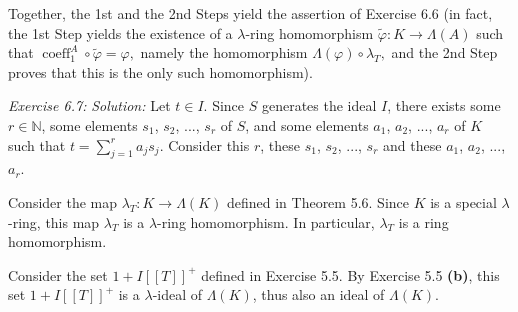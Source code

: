 \documentclass[numbers=enddot,12pt,final,onecolumn,notitlepage]{scrartcl}%
\begin{document}
Together, the 1st and the 2nd Steps yield the assertion of Exercise 6.6 (in
fact, the 1st Step yields the existence of a $\lambda$-ring homomorphism
$\widetilde{\varphi}:K\rightarrow\Lambda\left(  A\right)  $ such that
$\operatorname*{coeff}\nolimits_{1}^{A}\circ\widetilde{\varphi}=\varphi,$
namely the homomorphism $\Lambda\left(  \varphi\right)  \circ\lambda_{T},$ and
the 2nd Step proves that this is the only such homomorphism).

\textit{Exercise 6.7:} \textit{Solution:} Let $t\in I$. Since $S$ generates
the ideal $I$, there exists some $r\in\mathbb{N}$, some elements $s_{1}$,
$s_{2}$, $...$, $s_{r}$ of $S$, and some elements $a_{1}$, $a_{2}$, $...$,
$a_{r}$ of $K$ such that $t=\sum\limits_{j=1}^{r}a_{j}s_{j}$. Consider this
$r$, these $s_{1}$, $s_{2}$, $...$, $s_{r}$ and these $a_{1}$, $a_{2}$, $...$,
$a_{r}$.

Consider the map $\lambda_{T}:K\rightarrow\Lambda\left(  K\right)  $ defined
in Theorem 5.6. Since $K$ is a special $\lambda$-ring, this map $\lambda_{T}$
is a $\lambda$-ring homomorphism. In particular, $\lambda_{T}$ is a ring homomorphism.

Consider the set $1+I\left[  \left[  T\right]  \right]  ^{+}$ defined in
Exercise 5.5. By Exercise 5.5 \textbf{(b)}, this set $1+I\left[  \left[
T\right]  \right]  ^{+}$ is a $\lambda$-ideal of $\Lambda\left(  K\right)  $,
thus also an ideal of $\Lambda\left(  K\right)  $.
\end{document}
